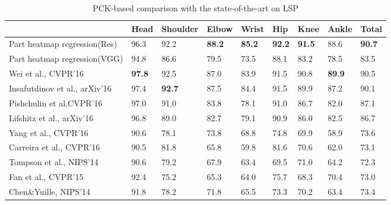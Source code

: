\documentclass[runningheads]{llncs}
\begin{document}
\setlength{\tabcolsep}{2pt}
\begin{table}
	\begin{center}
		\caption{PCK-based comparison with the state-of-the-art on LSP}
        \label{table:LSP}
		\begin{tabular}{lllllllll}
		 &Head & Shoulder & Elbow & Wrist & Hip & Knee  & Ankle & Total \\
		 \hline
		 Part heatmap regression(Res) & 96.3  & 92.2  & \textbf{88.2}  & \textbf{85.2}  & \textbf{92.2}  & \textbf{91.5} & 88.6 & \textbf{90.7} \\
         Part heatmap regression(VGG) & 94.8  & 86.6  & 79.5  & 73.5  & 88.1  & 83.2 & 78.5 & 83.5 \\
		 \hline
         Wei et al., CVPR'16 \cite{wei2016convolutional}& \textbf{97.8} & 92.5 & 87.0 & 83.9 & 91.5 & 90.8 & \textbf{89.9} & 90.5 \\
         Insafutdinov et al., arXiv'16 \cite{insafutdinov2016deepercut}& 97.4 & \textbf{92.7} & 87.5 & 84.4 & 91.5 & 89.9 & 87.2& 90.1 \\
         Pishchulin et al.CVPR'16 \cite{pishchulin2015deepcut} & 97.0 & 91.0 & 83.8 & 78.1 & 91.0 & 86.7 & 82.0 & 87.1 \\
         Lifshitz et al., arXiv'16 \cite{lifshitz2016human} & 96.8 & 89.0 & 82.7 & 79.1 & 90.9 & 86.0 & 82.5 & 86.7 \\
         Yang et al., CVPR'16 \cite{yang2016end}& 90.6 &78.1 & 73.8 & 68.8 & 74.8 &69.9 &58.9 &73.6 \\
         Carreira et al., CVPR'16 \cite{carreira2015human}& 90.5 & 81.8 & 65.8 & 59.8 & 81.6 & 70.6 & 62.0 & 73.1 \\
		 Tompson et al., NIPS'14 \cite{tompson2014joint}& 90.6  & 79.2  & 67.9  & 63.4  & 69.5  & 71.0 & 64.2 & 72.3 \\
		 Fan et al., CVPR'15 \cite{Fan_2015_CVPR}& 92.4  & 75.2  & 65.3  & 64.0  & 75.7  & 68.3 & 70.4 & 73.0 \\
		 Chen\&Yuille, NIPS'14 \cite{chen2014articulated}& 91.8  & 78.2  & 71.8  & 65.5  & 73.3  & 70.2 & 63.4 & 73.4 \\
		 
			\hline
		\end{tabular}
	\end{center}
\end{table}
\setlength{\tabcolsep}{1.4pt}
\end{document}
